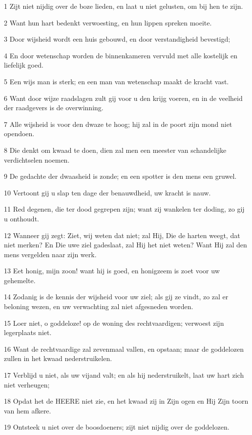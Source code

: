 \par 1 Zijt niet nijdig over de boze lieden, en laat u niet gelusten, om bij hen te zijn.
\par 2 Want hun hart bedenkt verwoesting, en hun lippen spreken moeite.
\par 3 Door wijsheid wordt een huis gebouwd, en door verstandigheid bevestigd;
\par 4 En door wetenschap worden de binnenkameren vervuld met alle kostelijk en liefelijk goed.
\par 5 Een wijs man is sterk; en een man van wetenschap maakt de kracht vast.
\par 6 Want door wijze raadslagen zult gij voor u den krijg voeren, en in de veelheid der raadgevers is de overwinning.
\par 7 Alle wijsheid is voor den dwaze te hoog; hij zal in de poort zijn mond niet opendoen.
\par 8 Die denkt om kwaad te doen, dien zal men een meester van schandelijke verdichtselen noemen.
\par 9 De gedachte der dwaasheid is zonde; en een spotter is den mens een gruwel.
\par 10 Vertoont gij u slap ten dage der benauwdheid, uw kracht is nauw.
\par 11 Red degenen, die ter dood gegrepen zijn; want zij wankelen ter doding, zo gij u onthoudt.
\par 12 Wanneer gij zegt: Ziet, wij weten dat niet; zal Hij, Die de harten weegt, dat niet merken? En Die uwe ziel gadeslaat, zal Hij het niet weten? Want Hij zal den mens vergelden naar zijn werk.
\par 13 Eet honig, mijn zoon! want hij is goed, en honigzeem is zoet voor uw gehemelte.
\par 14 Zodanig is de kennis der wijsheid voor uw ziel; als gij ze vindt, zo zal er beloning wezen, en uw verwachting zal niet afgesneden worden.
\par 15 Loer niet, o goddeloze! op de woning des rechtvaardigen; verwoest zijn legerplaats niet.
\par 16 Want de rechtvaardige zal zevenmaal vallen, en opstaan; maar de goddelozen zullen in het kwaad nederstruikelen.
\par 17 Verblijd u niet, als uw vijand valt; en als hij nederstruikelt, laat uw hart zich niet verheugen;
\par 18 Opdat het de HEERE niet zie, en het kwaad zij in Zijn ogen en Hij Zijn toorn van hem afkere.
\par 19 Ontsteek u niet over de boosdoeners; zijt niet nijdig over de goddelozen.
